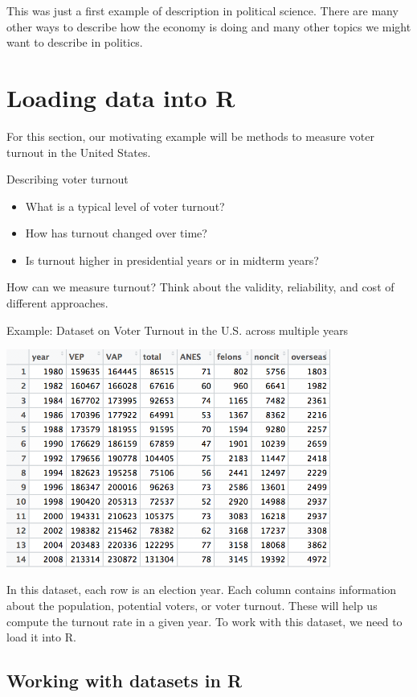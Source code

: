 \documentclass[
  letterpaper,
  DIV=11,
  numbers=noendperiod]{scrreprt}
\providecommand{\tightlist}{%
  \setlength{\itemsep}{0pt}\setlength{\parskip}{0pt}}\usepackage{longtable,booktabs,array}
\begin{document}
This was just a first example of description in political science. There
are many other ways to describe how the economy is doing and many other
topics we might want to describe in politics.

\hypertarget{loading-data-into-r}{%
\section{Loading data into R}\label{loading-data-into-r}}

For this section, our motivating example will be methods to measure
voter turnout in the United States.

Describing voter turnout

\begin{itemize}
\tightlist
\item
  What is a typical level of voter turnout?
\item
  How has turnout changed over time?
\item
  Is turnout higher in presidential years or in midterm years?
\end{itemize}

How can we measure turnout? Think about the validity, reliability, and
cost of different approaches.

Example: Dataset on Voter Turnout in the U.S. across multiple years

\includegraphics[width=0.8\textwidth,height=\textheight]{images/turnoutframe.png}

In this dataset, each row is an election year. Each column contains
information about the population, potential voters, or voter turnout.
These will help us compute the turnout rate in a given year. To work
with this dataset, we need to load it into R.

\hypertarget{working-with-datasets-in-r}{%
\subsection{Working with datasets in
R}\label{working-with-datasets-in-r}}
\end{document}

